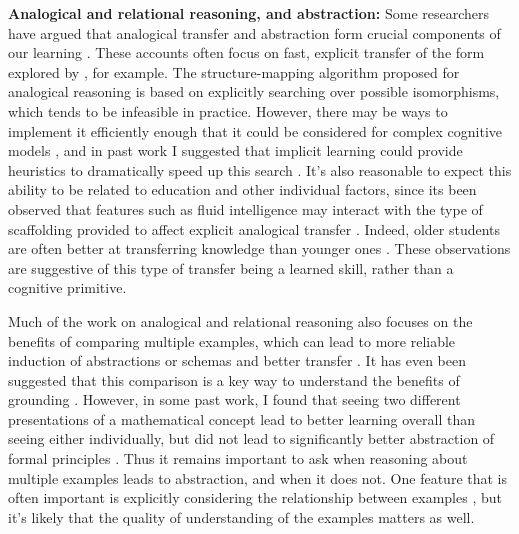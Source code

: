 \textbf{Analogical and relational reasoning, and abstraction:} Some researchers have argued that analogical transfer and abstraction form crucial components of our learning \citep[e.g.][]{Gentner2003, Lakoff1980, Gentner2017}. These accounts often focus on fast, explicit transfer of the form explored by \citet{Gick1980}, for example. The structure-mapping algorithm \citep{Falkenhainer1989} proposed for analogical reasoning is based on explicitly searching over possible isomorphisms, which tends to be infeasible in practice. However, there may be ways to implement it efficiently enough that it could be considered for complex cognitive models \citep{Forbus2017}, and in past work I suggested that implicit learning could provide heuristics to dramatically speed up this search \citep{Lampinen2017a}. It's also reasonable to expect this ability to be related to education and other individual factors, since its been observed that features such as fluid intelligence may interact with the type of scaffolding provided to affect explicit analogical transfer \citep{Kubricht2017}. Indeed, older students are often better at transferring knowledge than younger ones \citep[e.g.][]{Chen1999}. These observations are suggestive of this type of transfer being a learned skill, rather than a cognitive primitive. \par
Much of the work on analogical and relational reasoning also focuses on the benefits of comparing multiple examples, which can lead to more reliable induction of abstractions or schemas and better transfer \citep{Gick1980, Gentner2017}. It has even been suggested that this comparison is a key way to understand the benefits of grounding \citep{Jamrozik2016}. However, in some past work, I found that seeing two different presentations of a mathematical concept lead to better learning overall than seeing either individually, but did not lead to significantly better abstraction of formal principles \citep{Lampinen2017b}. Thus it remains important to ask when reasoning about multiple examples leads to abstraction, and when it does not. One feature that is often important is explicitly considering the relationship between examples \citep{Gentner2017}, but it's likely that the quality of understanding of the examples matters as well. \par 
